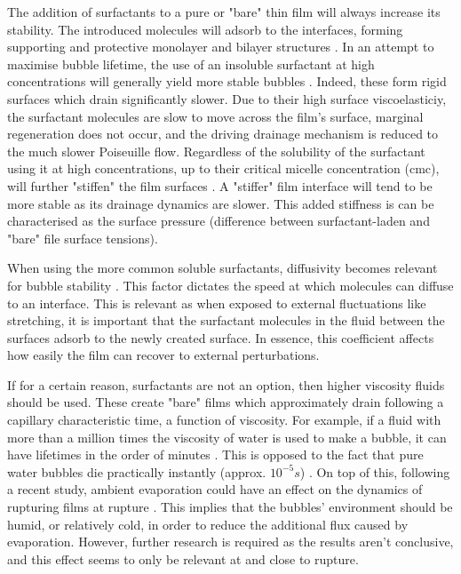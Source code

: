\documentclass[a4paper,12pt]{article}
\numberwithin{equation}{section}
\numberwithin{figure}{section}
\numberwithin{table}{section}
\begin{document}
The addition of surfactants to a pure or "bare" thin film will always increase its stability. The introduced molecules will adsorb to the interfaces, forming supporting and protective monolayer and bilayer structures \cite{Gast1997, Mysels1968Nomenclature}. In an attempt to maximise bubble lifetime, the use of an insoluble surfactant at high concentrations will generally yield more stable bubbles \cite{Petit2015, ChampougnyNotBare2016, Bhamla2017}. Indeed, these form rigid surfaces which drain significantly slower. Due to their high surface viscoelasticiy, the surfactant molecules are slow to move across the film's surface, marginal regeneration does not occur, and the driving drainage mechanism is reduced to the much slower Poiseuille flow. Regardless of the solubility of the surfactant using it at high concentrations, up to their critical micelle concentration (cmc), will further "stiffen" the film surfaces \cite{Bhamla2017}. A "stiffer" film interface will tend to be more stable as its drainage dynamics are slower. This added stiffness is can be characterised as the surface pressure (difference between surfactant-laden and "bare" file surface tensions).

When using the more common soluble surfactants, diffusivity becomes relevant for bubble stability \cite{deGennesYoung2001}. This factor dictates the speed at which molecules can diffuse to an interface. This is relevant as when exposed to external fluctuations like stretching, it is important that the surfactant molecules in the fluid between the surfaces adsorb to the newly created surface. In essence, this coefficient affects how easily the film can recover to external perturbations.

If for a certain reason, surfactants are not an option, then higher viscosity fluids should be used. These create "bare" films which approximately drain following a capillary characteristic time, a function of viscosity. For example, if a fluid with more than a million times the viscosity of water is used to make a bubble, it can have lifetimes in the order of minutes \cite{Debregeas1998}. This is opposed to the fact that pure water bubbles die practically instantly (approx. $10^{-5} s$) \cite{Lhuissier2011}. On top of this, following a recent study, ambient evaporation could have an effect on the dynamics of rupturing films at rupture \cite{ChampougnyEvap2018}. This implies that the bubbles' environment should be humid, or relatively cold, in order to reduce the additional flux caused by evaporation. However, further research is required as the results aren't conclusive, and this effect seems to only be relevant at and close to rupture.
\end{document}
